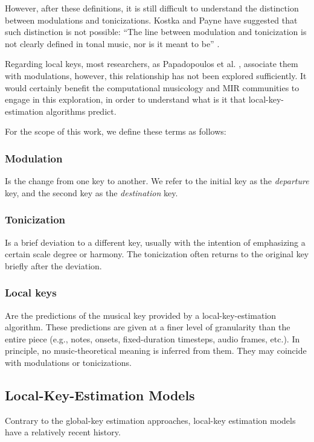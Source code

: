However, after these definitions, it is still difficult to understand the distinction between modulations and tonicizations. Kostka and Payne have suggested that such distinction is not possible: ``The line between modulation and tonicization is not clearly defined in tonal music, nor is it meant to be'' \cite{kostka2008tonal}. 

Regarding local keys, most researchers, as Papadopoulos et al. \cite{papadopoulos_local_2009}, associate them with modulations, however, this relationship has not been explored sufficiently. It would certainly benefit the computational musicology and MIR communities to engage in this exploration, in order to understand what is it that local-key-estimation algorithms predict.

For the scope of this work, we define these terms as follows:

\subsubsection{Modulation} 
Is the change from one key to another. We refer to the initial key as the \emph{departure} key, and the second key as the \emph{destination} key.

\subsubsection{Tonicization} 
Is a brief deviation to a different key, usually with the intention of emphasizing a certain scale degree or harmony. 
The tonicization often returns to the original key briefly after the deviation.

\subsubsection{Local keys}
Are the predictions of the musical key provided by a local-key-estimation algorithm. 
These predictions are given at a finer level of granularity than the entire piece (e.g., notes, onsets, fixed-duration timesteps, audio frames, etc.).
In principle, no music-theoretical meaning is inferred from them. They may coincide with modulations or tonicizations.

\subsection{Local-Key-Estimation Models}\label{ssec:localkey}

Contrary to the global-key estimation approaches, local-key estimation models have a relatively recent history.

